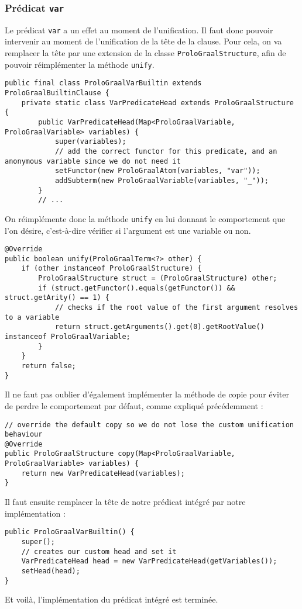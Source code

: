 \documentclass[../report.tex]{subfiles}
\begin{document}
\subsubsection{Prédicat \texttt{var}}
Le prédicat \texttt{var} a un effet au moment de l'unification. Il faut donc pouvoir intervenir au moment de l'unification de la tête de la clause. Pour cela, on va remplacer la tête par une extension de la classe \texttt{ProloGraalStructure}, afin de pouvoir réimplémenter la méthode \texttt{unify}.
\begin{verbatim}
public final class ProloGraalVarBuiltin extends ProloGraalBuiltinClause {
    private static class VarPredicateHead extends ProloGraalStructure {
        public VarPredicateHead(Map<ProloGraalVariable, ProloGraalVariable> variables) {
            super(variables);
            // add the correct functor for this predicate, and an anonymous variable since we do not need it
            setFunctor(new ProloGraalAtom(variables, "var"));
            addSubterm(new ProloGraalVariable(variables, "_"));
        }
        // ...
\end{verbatim}
On réimplémente donc la méthode \texttt{unify} en lui donnant le comportement que l'on désire, c'est-à-dire vérifier si l'argument est une variable ou non.
\begin{verbatim}
@Override
public boolean unify(ProloGraalTerm<?> other) {
    if (other instanceof ProloGraalStructure) {
        ProloGraalStructure struct = (ProloGraalStructure) other;
        if (struct.getFunctor().equals(getFunctor()) && struct.getArity() == 1) {
            // checks if the root value of the first argument resolves to a variable
            return struct.getArguments().get(0).getRootValue() instanceof ProloGraalVariable;
        }
    }
    return false;
}
\end{verbatim}
Il ne faut pas oublier d'également implémenter la méthode de copie pour éviter de perdre le comportement par défaut, comme expliqué précédemment :
\begin{verbatim}
// override the default copy so we do not lose the custom unification behaviour
@Override
public ProloGraalStructure copy(Map<ProloGraalVariable, ProloGraalVariable> variables) {
    return new VarPredicateHead(variables);
}
\end{verbatim}
Il faut ensuite remplacer la tête de notre prédicat intégré par notre implémentation :
\begin{verbatim}
public ProloGraalVarBuiltin() {
    super();
    // creates our custom head and set it
    VarPredicateHead head = new VarPredicateHead(getVariables());
    setHead(head);
}  
\end{verbatim}
Et voilà, l'implémentation du prédicat intégré est terminée.
\end{document}
